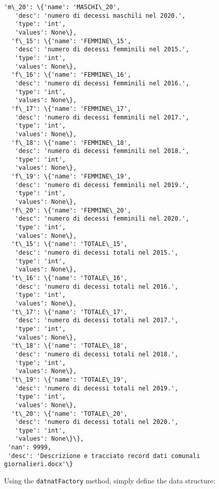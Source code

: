 \documentclass[11pt]{article}
\begin{document}
\begin{tcolorbox}[breakable, size=fbox, boxrule=.5pt, pad at break*=1mm, opacityfill=0]
\begin{Verbatim}[commandchars=\\\{\}]
  'm\_20': \{'name': 'MASCHI\_20',
   'desc': 'numero di decessi maschili nel 2020.',
   'type': 'int',
   'values': None\},
  'f\_15': \{'name': 'FEMMINE\_15',
   'desc': 'numero di decessi femminili nel 2015.',
   'type': 'int',
   'values': None\},
  'f\_16': \{'name': 'FEMMINE\_16',
   'desc': 'numero di decessi femminili nel 2016.',
   'type': 'int',
   'values': None\},
  'f\_17': \{'name': 'FEMMINE\_17',
   'desc': 'numero di decessi femminili nel 2017.',
   'type': 'int',
   'values': None\},
  'f\_18': \{'name': 'FEMMINE\_18',
   'desc': 'numero di decessi femminili nel 2018.',
   'type': 'int',
   'values': None\},
  'f\_19': \{'name': 'FEMMINE\_19',
   'desc': 'numero di decessi femminili nel 2019.',
   'type': 'int',
   'values': None\},
  'f\_20': \{'name': 'FEMMINE\_20',
   'desc': 'numero di decessi femminili nel 2020.',
   'type': 'int',
   'values': None\},
  't\_15': \{'name': 'TOTALE\_15',
   'desc': 'numero di decessi totali nel 2015.',
   'type': 'int',
   'values': None\},
  't\_16': \{'name': 'TOTALE\_16',
   'desc': 'numero di decessi totali nel 2016.',
   'type': 'int',
   'values': None\},
  't\_17': \{'name': 'TOTALE\_17',
   'desc': 'numero di decessi totali nel 2017.',
   'type': 'int',
   'values': None\},
  't\_18': \{'name': 'TOTALE\_18',
   'desc': 'numero di decessi totali nel 2018.',
   'type': 'int',
   'values': None\},
  't\_19': \{'name': 'TOTALE\_19',
   'desc': 'numero di decessi totali nel 2019.',
   'type': 'int',
   'values': None\},
  't\_20': \{'name': 'TOTALE\_20',
   'desc': 'numero di decessi totali nel 2020.',
   'type': 'int',
   'values': None\}\},
 'nan': 9999,
 'desc': 'Descrizione e tracciato record dati comunali giornalieri.docx'\}
\end{Verbatim}
\end{tcolorbox}
        
    Using the \texttt{datnatFactory} method, simply define the data
structure:
\end{document}
